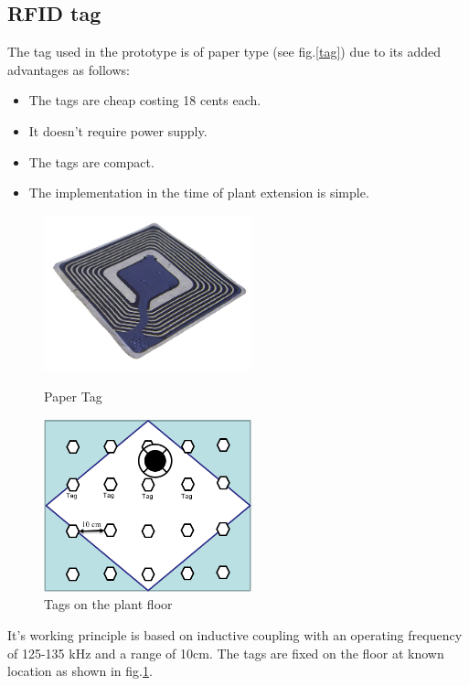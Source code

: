 \subsection{RFID tag}
The tag used in the prototype is of paper type (see fig.\ref{tag}) due to its added advantages as follows:
\begin{itemize}
	\item The tags are cheap costing 18 cents each.
	\item It doesn't require power supply.
	\item The tags are compact.
	\item The implementation in the time of plant extension is simple.
\end{itemize}
\begin{figure}[!htbp]
	\centering
	\begin{minipage}{.5\textwidth}
		\centering
		\includegraphics[width = 6cm]{Pictures/tag}%
		\caption{Paper Tag}
		\label{tag}
	\end{minipage}%
	\begin{minipage}{.5\textwidth}
		\centering
		\includegraphics[width = 6cm]{Pictures/tagsfloor}%
		\caption{Tags on the plant floor}
		\label{tags_floor}
	\end{minipage}
\end{figure}
It's working principle is based on inductive coupling with an operating frequency of 125-135 kHz and a range of 10cm. The tags are fixed on the floor at known location as shown in fig.\ref{tags_floor}.
